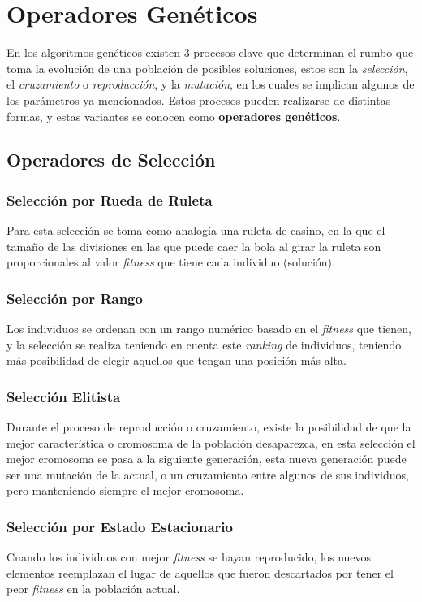 \documentclass[a4paper, 12pt]{article}
\begin{document}
\section{Operadores Genéticos}
En los algoritmos genéticos existen 3 procesos clave que determinan el rumbo que toma la evolución de una población de posibles soluciones, estos son la \emph{selección}, el \emph{cruzamiento} o \emph{reproducción}, y la \emph{mutación}, en los cuales se implican algunos de los parámetros ya mencionados. Estos procesos pueden realizarse de distintas formas, y estas variantes se conocen como \textbf{operadores genéticos}.

\subsection{Operadores de Selección}
\subsubsection{Selección por Rueda de Ruleta}
Para esta selección se toma como analogía una ruleta de casino, en la que el tamaño de las divisiones en las que puede caer la bola al girar la ruleta son proporcionales al valor \emph{fitness} que tiene cada individuo (solución).

\subsubsection{Selección por Rango}
Los individuos se ordenan con un rango numérico basado en el \emph{fitness} que tienen, y la selección se realiza teniendo en cuenta este \emph{ranking} de individuos, teniendo más posibilidad de elegir aquellos que tengan una posición más alta.

\subsubsection{Selección Elitista}
Durante el proceso de reproducción o cruzamiento, existe la posibilidad de que la mejor característica o cromosoma de la población desaparezca, en esta selección el mejor cromosoma se pasa a la siguiente generación, esta nueva generación puede ser una mutación de la actual, o un cruzamiento entre algunos de sus individuos, pero manteniendo siempre el mejor cromosoma.

\subsubsection{Selección por Estado Estacionario}
Cuando los individuos con mejor \emph{fitness} se hayan reproducido, los nuevos elementos reemplazan el lugar de aquellos que fueron descartados por tener el peor \emph{fitness} en la población actual.
\end{document}
